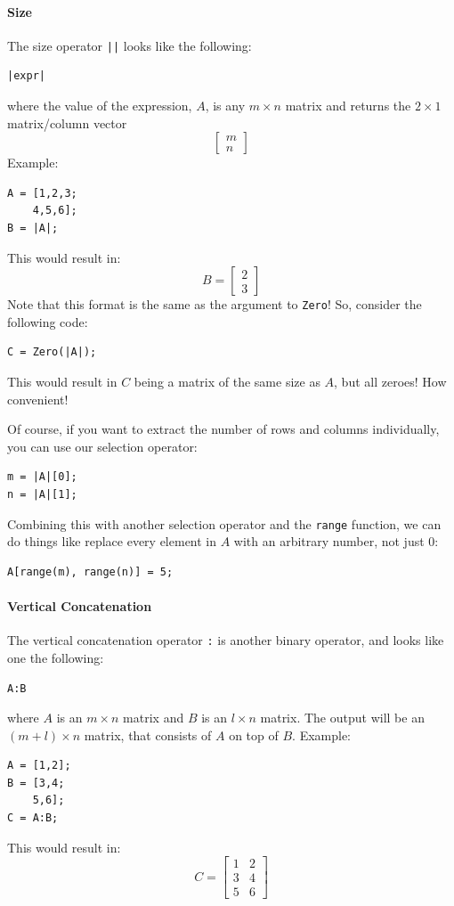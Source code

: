 \paragraph{Size}
The size operator \verb=||=  looks like the following:
\begin{lstlisting}
|expr|
\end{lstlisting}
where the value of the expression, $A$, is any $m\times n$ matrix and returns the $2\times 1$ matrix/column vector
$$\begin{bmatrix}m\\n\end{bmatrix}$$
Example:
\begin{lstlisting}
A = [1,2,3;
    4,5,6];
B = |A|;
\end{lstlisting}
This would result in:
$$B=\begin{bmatrix}
2\\3
\end{bmatrix}$$
Note that this format is the same as the argument to \verb=Zero=!  So, consider the following code:
\begin{lstlisting}
C = Zero(|A|);
\end{lstlisting}
This would result in $C$ being a matrix of the same size as $A$, but all zeroes!  How convenient!

Of course, if you want to extract the number of rows and columns individually, you can use our selection operator:
\begin{lstlisting}
m = |A|[0];
n = |A|[1];
\end{lstlisting}
Combining this with another selection operator and the \verb=range= function, we can do things like replace every element in $A$ with an arbitrary number, not just 0:
\begin{lstlisting}
A[range(m), range(n)] = 5;
\end{lstlisting}

\paragraph{Vertical Concatenation}
The vertical concatenation operator \verb=:= is another binary operator, and looks like one the following:
\begin{lstlisting}
A:B
\end{lstlisting}
where $A$ is an $m \times n$ matrix and $B$ is an $l \times n$ matrix.  The output will be an $(m+l) \times n $ matrix, that consists of $A$ on top of $B$.  Example:
\begin{lstlisting}
A = [1,2];
B = [3,4;
    5,6];
C = A:B;
\end{lstlisting}
This would result in:
$$C=\begin{bmatrix}
1&2\\
3&4\\
5&6
\end{bmatrix}$$

